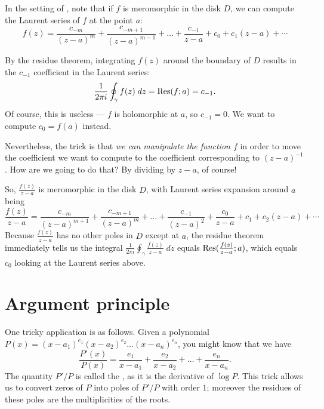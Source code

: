 \begin{remark}
	\label{remark:cauchy_integral_intuition}
	In the setting of ,
	note that if $f$ is meromorphic in the disk $D$, we can compute the Laurent series of $f$ at the
	point $a$:
	\[
		f(z) =
		\frac{c_{-m}}{(z-a)^m}
		+ \frac{c_{-m+1}}{(z-a)^{m-1}}
		+ \dots
		+ \frac{c_{-1}}{z-a} + c_0 + c_1 (z-a) + \cdots
	\]

	By the residue theorem, integrating $f(z)$ around the boundary of $D$
	results in the $c_{-1}$ coefficient in the Laurent series:
	\[
		\frac{1}{2\pi i} \oint_\gamma f(z) \; dz = \operatorname{Res}(f; a) = c_{-1}.
	\]
	Of course, this is useless --- $f$ is holomorphic at $a$, so $c_{-1} = 0$.
	We want to compute $c_0 = f(a)$ instead.

	Nevertheless, the trick is that \emph{we can manipulate the function $f$} in order to move the
	coefficient we want to compute to the coefficient corresponding to $(z-a)^{-1}$.
	How are we going to do that? By dividing by $z-a$, of course!

	So, $\frac{f(z)}{z-a}$ is meromorphic in the disk $D$, with Laurent series expansion around $a$
	being
	\[
		\frac{f(z)}{z-a} =
		\frac{c_{-m}}{(z-a)^{m+1}}
		+ \frac{c_{-m+1}}{(z-a)^{m}}
		+ \dots
		+ \frac{c_{-1}}{(z-a)^2} + \frac{c_0}{z-a} + c_1 + c_2 (z-a) + \cdots
	\]
	Because $\frac{f(z)}{z-a}$ has no other poles in $D$ except at $a$,
	the residue theorem immediately tells us the integral
	$\frac{1}{2\pi i} \oint_\gamma \frac{f(z)}{z-a} \; dz$ equals $\operatorname{Res}(\frac{f(z)}{z-a}; a)$,
	which equals $c_0$ looking at the Laurent series above.
\end{remark}

\section{Argument principle}
One tricky application is as follows.
Given a polynomial $P(x) = (x-a_1)^{e_1}(x-a_2)^{e_2}\dots(x-a_n)^{e_n}$, you might know that we have
\[ \frac{P'(x)}{P(x)} = \frac{e_1}{x-a_1} + \frac{e_2}{x-a_2} + \dots + \frac{e_n}{x-a_n}. \]
The quantity $P'/P$ is called the , as it is the derivative of $\log P$.
This trick allows us to convert zeros of $P$ into poles of $P'/P$ with order $1$;
moreover the residues of these poles are the multiplicities of the roots.

